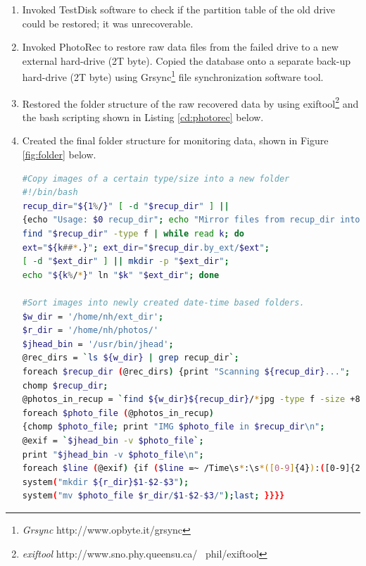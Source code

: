 \begin{enumerate}
\item Invoked TestDisk software to check if the partition table of the old drive could be restored; it was unrecoverable.
\item Invoked PhotoRec to restore raw data files from the failed drive to a new external hard-drive (2T byte). Copied the database onto a separate  back-up hard-drive (2T byte) using Grsync\footnote{\emph{Grsync} http://www.opbyte.it/grsync} file synchronization software tool. 
\item Restored the folder structure of the raw recovered data by using exiftool\footnote{\emph{exiftool} http://www.sno.phy.queensu.ca/~ phil/exiftool} \cite{Exiftool2013} and the bash scripting shown in Listing \ref{cd:photorec} below.
\item Created the final folder structure for monitoring data, shown in Figure \ref{fig:folder} below.

\begin{lstlisting}[float, language=bash, caption={[Bash script.]Bash script to sort Photorec recovered images by extension; and into date-time based folders.}, label=cd:photorec]
#Copy images of a certain type/size into a new folder
#!/bin/bash
recup_dir="${1%/}" [ -d "$recup_dir" ] || 
{echo "Usage: $0 recup_dir"; echo "Mirror files from recup_dir into recup_dir.by_ext, organized by extension"; exit 1};
find "$recup_dir" -type f | while read k; do
ext="${k##*.}"; ext_dir="$recup_dir.by_ext/$ext";
[ -d "$ext_dir" ] || mkdir -p "$ext_dir";
echo "${k%/*}" ln "$k" "$ext_dir"; done

#Sort images into newly created date-time based folders.
$w_dir = '/home/nh/ext_dir';
$r_dir = '/home/nh/photos/'
$jhead_bin = '/usr/bin/jhead';
@rec_dirs = `ls ${w_dir} | grep recup_dir`;
foreach $recup_dir (@rec_dirs) {print "Scanning ${recup_dir}...";
chomp $recup_dir;
@photos_in_recup = `find ${w_dir}${recup_dir}/*jpg -type f -size +800k`;
foreach $photo_file (@photos_in_recup) 
{chomp $photo_file; print "IMG $photo_file in $recup_dir\n";
@exif = `$jhead_bin -v $photo_file`;
print "$jhead_bin -v $photo_file\n";
foreach $line (@exif) {if ($line =~ /Time\s*:\s*([0-9]{4}):([0-9]{2}):([0-9]{2})\s[0-9:]{8}$/) {print "IMG $photo_file $1-$2-$3\n"; 
system("mkdir ${r_dir}$1-$2-$3"); 
system("mv $photo_file $r_dir/$1-$2-$3/");last; }}}}
\end{lstlisting}
\end{enumerate}

